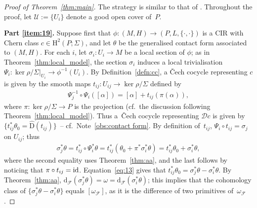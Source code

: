 \documentclass[10pt,a4paper]{amsart}
\numberwithin{equation}{section}
\newcommand{\de}{\mathrm{d}} %
\newcommand{\JM}{(P,L,\{\cdot,\cdot\})} %
\newcommand{\CM}{(M,H)} %
\newcommand{\HH}{\mathrm{H}}
\begin{document}
\begin{proof}[Proof of Theorem~\ref{thm:main}] The strategy is similar to that of \cite[Theorems~4.2 and~4.3]{dd}. Throu\-ghout the proof, let $\mathcal{U} := \{U_i\}$ denote a good open cover of~$P$.

{\bf Part \ref{item:19}.} Suppose f\/irst that $\phi\colon \CM \to \JM$ is a CIR with Chern class $c \in \HH^2(P;\Sigma)$, and let $\theta$ be the generalised contact form associated to $\CM$. For each $i$, let $\sigma_i \colon U_i \to M$ be a local section of $\phi$; as in Theorem~\ref{thm:local_model}, the section $\sigma_i$ induces a local trivialisation $\Psi_i \colon \ker \rho/\Sigma|_{U_i} \to \phi^{-1}(U_i)$. By Def\/inition~\ref{defn:cc}, a \v{C}ech cocycle representing $c$ is given by the smooth maps $t_{ij} \colon U_{ij} \to \ker \rho /\Sigma$ def\/ined by
 \begin{gather*}
 \Psi_j^{-1} \circ \Psi_i([\alpha]) = [\alpha] + t_{ij}(\pi(\alpha)),
 \end{gather*}
where $\pi\colon \ker \rho/\Sigma \to P$ is the projection (cf.\ the discussion following Theorem~\ref{thm:local_model}). Thus a~\v{C}ech cocycle representing $\mathcal{D}c$ is given by $\{t_{ij}^*\theta_0 = \hat{\mathrm{D}}(t_{ij})\}$~-- cf.\ Note~\ref{obs:contact form}. By def\/inition of~$t_{ij}$, $\Psi_i \circ t_{ij} = \sigma_j$ on $U_{ij}$; thus
 \begin{gather} \label{eq:13}
 \sigma_j^* \theta =t_{ij}^* \circ \Psi_i^*\theta = t_{ij}^*(\theta_0 + \pi^* \sigma_i^*\theta) = t_{ij}^*\theta_0 + \sigma_i^* \theta,
 \end{gather}
where the second equality uses Theorem~\ref{thm:aa}, and the last follows by noticing that $\pi \circ t_{ij} = {\rm id}$. Equation~\eqref{eq:13} gives that $t_{ij}^*\theta_0 = \sigma_j^*\theta - \sigma_i^*\theta$. By Theorem~\ref{thm:aa}, $\de_{\mathcal{F}}(\sigma_j^* \theta) = \omega = \de_{\mathcal{F}}(\sigma_i^*\theta)$; this implies that the cohomology class of $\{\sigma_j^*\theta - \sigma_i^* \theta\}$ equals $[\omega_{\mathcal{F}}]$, as it is the dif\/ference of two primitives of~$\omega_{\mathcal{F}}$.


\end{proof}
\end{document}
